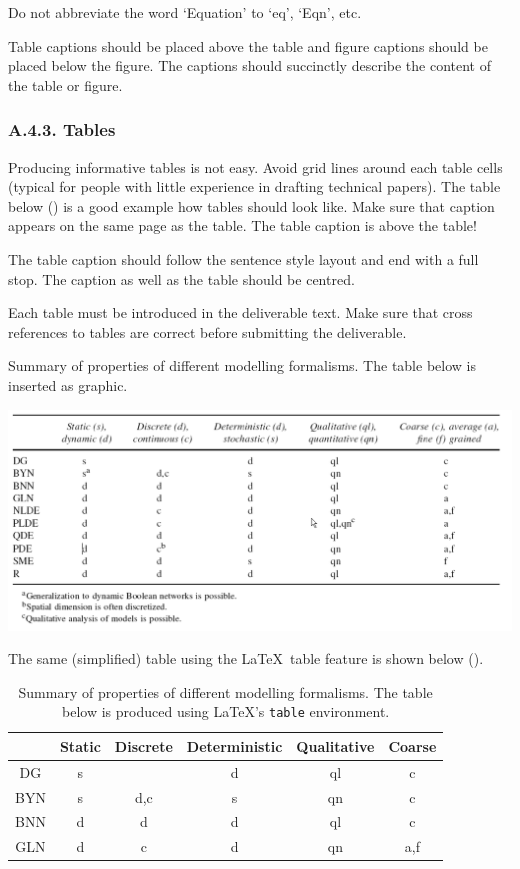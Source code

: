 Do not abbreviate the word ‘Equation’ to ‘eq’, ‘Eqn’, etc.

Table captions should be placed above the table and figure captions should be placed below the figure. The captions should succinctly describe the content of the table or figure.

\subsubsection*{A.4.3. Tables}
\label{sec:appendix-a43-tables}

Producing informative tables is not easy. Avoid grid lines around each table cells (typical for people with little experience in drafting technical papers). The table below () is a good example how tables should look like. Make sure that caption appears on the same page as the table. The table caption is above the table!

The table caption should follow the sentence style layout and end with a full stop. The caption as well as the table should be centred.

Each table must be introduced in the deliverable text. Make sure that cross references to tables are correct before submitting the deliverable.

\begin{table}[htb]
	\centering
	\caption{Summary of properties of different modelling formalisms. The table below is inserted as graphic.}
	\label{tab:graphicastable}
	\includegraphics[width=1.00\linewidth]{graphics/graphicastable}  
\end{table}

The same (simplified) table using the \LaTeX\ table feature is shown below ().

\begin{table}[htb]
	\centering
	\caption{Summary of properties of different modelling formalisms. The table below is produced using \LaTeX's {\tt table} environment.}
	\label{tab:latextable}
	\begin{tabular}{cccccc}
		\hline
		& Static & Discrete & Deterministic & Qualitative & Coarse \\
		\hline
		DG & s &  & d & ql & c \\
		BYN & s & d,c & s & qn & c\\
		BNN & d & d & d & ql & c\\
		GLN & d & c & d & qn & a,f\\
		\hline
	\end{tabular}
\end{table}

